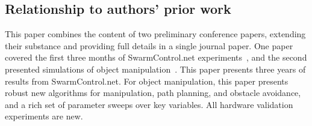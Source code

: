 \subsection{Relationship to authors' prior work}
 This paper combines the content of two preliminary conference papers, extending their substance and providing full details in a single journal paper.  One paper covered the first three months of SwarmControl.net experiments~\cite{swarmcontrol2013}, and the second presented simulations of object manipulation~\cite{ShahrokhiIROS2015}. This paper presents three years of results from SwarmControl.net. For object manipulation, this paper presents robust new algorithms for manipulation, path planning, and obstacle avoidance, and a rich set of parameter sweeps over key variables. All hardware validation experiments are new. 
 

 


